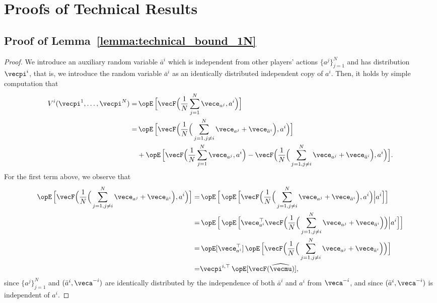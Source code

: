 
\section{Proofs of Technical Results}


\subsection{Proof of Lemma~\ref{lemma:technical_bound_1N}}\label{app:technical_lemma}
\begin{proof}
We introduce an auxiliary random variable $\bar{a}^i$ which is independent from other players' actions $\{ a^j\}_{j=1}^N$ and has distribution $\vecpi^i$, that is, we introduce the random variable $\bar{a}^i$ as an identically distributed independent copy of $a^i$.
Then, it holds by simple computation that
\begin{align*}
V^i(\vecpi^1, \ldots, \vecpi^N) = & \Exop \Big[ \vecF\Big( \frac{1}{N} \sum_{j=1}^N \vece_{a^j}, a^i\Big) \Big]\\
= &\Exop \Big[\vecF\Big(\frac{1}{N}\Big(\sum_{j=1, j\neq i}^N \vece_{a^j} + \vece_{\bar{a}^i}\Big), a^i \Big)\Big] \\ 
    &+ \Exop \Big[ \vecF\Big(\frac{1}{N}\sum_{j=1}^N \vece_{a^j}, a^i\Big) -\vecF\Big( \frac{1}{N}\Big(\sum_{j=1, j\neq i}^N \vece_{a^j} + \vece_{\bar{a}^i}\Big), a^i\Big)\Big].
\end{align*}
For the first term above, we observe that
\begin{align*}
   \Exop \Big[\vecF\Big( \frac{1}{N}\Big(\sum_{j=1, j\neq i}^N \vece_{a^j} + \vece_{\bar{a}^i}\Big), a^i\Big)\Big] = &\Exop \Big[ \Exop \Big[\vecF\Big( \frac{1}{N}\Big(\sum_{j=1, j\neq i}^N \vece_{a^j} + \vece_{\bar{a}^i}\Big), a^i\Big) \Big| a^i\Big]\Big] \\
   = &\Exop \Big[ \Exop \Big[\vece_{a^i}^\top \vecF\Big(\frac{1}{N}\Big(\sum_{j=1, j\neq i}^N \vece_{a^j} + \vece_{\bar{a}^i}\Big)\Big) \Big| a^i\Big]\Big] \\
   = &\Exop [ \vece_{a^i}^\top] \Exop \Big[ \vecF\Big(\frac{1}{N}\Big(\sum_{j=1, j\neq i}^N \vece_{a^j} + \vece_{\bar{a}^i}\Big)\Big)\Big] \\
   = & \vecpi^{i, \top} \Exop [\vecF(\widehat{\vecmu})],
\end{align*}
since $\{a^j \}_{j=1}^N$ and $(\bar{a}^i,\veca^{-i})$ are identically distributed by the independence of both $\bar{a}^i$ and $a^i$ from $\veca^{-i}$, and since
$(\bar{a}^i,\veca^{-i})$ is independent of $a^i$.


\end{proof}
